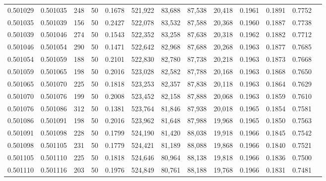 \begin{tabular}{rrrrrrrrrrrrr}
0.501029 & 0.501035 & 248 &  50 &                                     0.1678 & 521,922 &  83,688 &  87,538 &  20,418 & 0.1961 & 0.1891 & 0.7752 \\
0.501035 & 0.501039 & 156 &  50 &                                     0.2427 & 522,078 &  83,532 &  87,588 &  20,368 & 0.1960 & 0.1887 & 0.7738 \\
0.501039 & 0.501046 & 274 &  50 &                                     0.1543 & 522,352 &  83,258 &  87,638 &  20,318 & 0.1962 & 0.1882 & 0.7712 \\
0.501046 & 0.501054 & 290 &  50 &                                     0.1471 & 522,642 &  82,968 &  87,688 &  20,268 & 0.1963 & 0.1877 & 0.7685 \\
0.501054 & 0.501059 & 188 &  50 &                                     0.2101 & 522,830 &  82,780 &  87,738 &  20,218 & 0.1963 & 0.1873 & 0.7668 \\
0.501059 & 0.501065 & 198 &  50 &                                     0.2016 & 523,028 &  82,582 &  87,788 &  20,168 & 0.1963 & 0.1868 & 0.7650 \\
0.501065 & 0.501070 & 225 &  50 &                                     0.1818 & 523,253 &  82,357 &  87,838 &  20,118 & 0.1963 & 0.1864 & 0.7629 \\
0.501070 & 0.501076 & 199 &  50 &                                     0.2008 & 523,452 &  82,158 &  87,888 &  20,068 & 0.1963 & 0.1859 & 0.7610 \\
0.501076 & 0.501086 & 312 &  50 &                                     0.1381 & 523,764 &  81,846 &  87,938 &  20,018 & 0.1965 & 0.1854 & 0.7581 \\
0.501086 & 0.501091 & 198 &  50 &                                     0.2016 & 523,962 &  81,648 &  87,988 &  19,968 & 0.1965 & 0.1850 & 0.7563 \\
0.501091 & 0.501098 & 228 &  50 &                                     0.1799 & 524,190 &  81,420 &  88,038 &  19,918 & 0.1966 & 0.1845 & 0.7542 \\
0.501098 & 0.501105 & 231 &  50 &                                     0.1779 & 524,421 &  81,189 &  88,088 &  19,868 & 0.1966 & 0.1840 & 0.7521 \\
0.501105 & 0.501110 & 225 &  50 &                                     0.1818 & 524,646 &  80,964 &  88,138 &  19,818 & 0.1966 & 0.1836 & 0.7500 \\
0.501110 & 0.501116 & 203 &  50 &                                     0.1976 & 524,849 &  80,761 &  88,188 &  19,768 & 0.1966 & 0.1831 & 0.7481 \\

\end{tabular}
